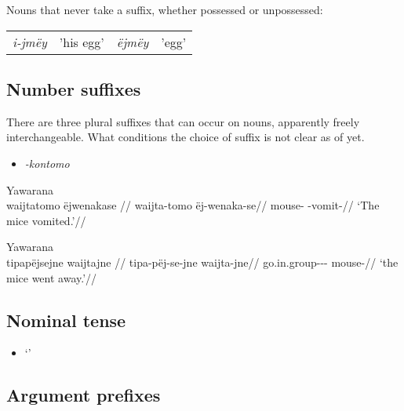 \documentclass{memoir}
\begin{document}
\ex\label{unsuffixednouns} Nouns that never take a suffix, whether
possessed or unpossessed:

\begin{tabular}[t]{llll}

\emph{i-jmëy} & 'his egg’ & \emph{ëjmëy} & 'egg’ \\

\end{tabular}
 \xe

\subsection{\texorpdfstring{Number suffixes
\label{sec:nominalnumber}}{Number suffixes }}

There are three plural suffixes that can occur on nouns, apparently
freely interchangeable. What conditions the choice of suffix is not
clear as of yet.

\begin{itemize}
\tightlist
\item
  \emph{-kontomo}
\end{itemize}

\ex Yawarana \\
\label{ctorat-17}    \begingl
    \glpreamble waijtatomo ëjwenakase //
    \gla waijta-tomo ëj-wenaka-se//
    \glb mouse- -vomit-//
        \glft ‘The mice vomited.’//  
    \endgl 
\xe

\ex Yawarana \\
\label{ctorat-40}    \begingl
    \glpreamble tipapëjsejne waijtajne //
    \gla tipa-pëj-se-jne waijta-jne//
    \glb go.in.group--- mouse-//
        \glft ‘the mice went away.’//  
    \endgl 
\xe

\subsection{\texorpdfstring{Nominal tense
\label{sec:nominaltense}}{Nominal tense }}

\begin{itemize}
\tightlist
\item
   `'
\end{itemize}

\subsection{\texorpdfstring{Argument prefixes
\label{sec:nominalperson}}{Argument prefixes }}
\end{document}
